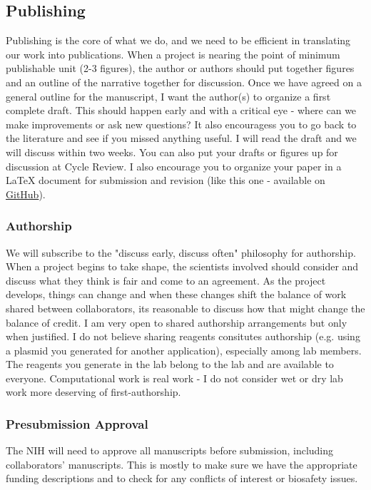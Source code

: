 \documentclass[10pt, a4paper, twocolumn]{article} %
\begin{document}
\subsection{Publishing}
Publishing is the core of what we do, and we need to be efficient in translating our work into publications. When a project is nearing the point of minimum publishable unit (2-3 figures), the author or authors should put together figures and an outline of the narrative together for discussion. Once we have agreed on a general outline for the manuscript, I want the author(s) to organize a first complete draft. This should happen early and with a critical eye - where can we make improvements or ask new questions? It also encouragess you to go back to the literature and see if you missed anything useful. I will read the draft and we will discuss within two weeks. You can also put your drafts or figures up for discussion at Cycle Review. I also encourage you to organize your paper in a LaTeX document for submission and revision (like this one - available on \href{https://github.com/QVEU/QVEU/blob/main/ExpectationsDocument/main.tex}{GitHub}).

\subsubsection{Authorship}
We will subscribe to the "discuss early, discuss often" philosophy for authorship. When a project begins to take shape, the scientists involved should consider and discuss what they think is fair and come to an agreement. As the project develops, things can change and when these changes shift the balance of work shared between collaborators, its reasonable to discuss how that might change the balance of credit. I am very open to shared authorship arrangements but only when justified. I do not believe sharing reagents consitutes authorship (e.g. using a plasmid you generated for another application), especially among lab members. The reagents you generate in the lab belong to the lab and are available to everyone. Computational work is real work - I do not consider wet or dry lab work more deserving of first-authorship.

\subsubsection{Presubmission Approval}
The NIH will need to approve all manuscripts before submission, including collaborators' manuscripts. This is mostly to make sure we have the appropriate funding descriptions and to check for any conflicts of interest or biosafety issues.
\end{document}
